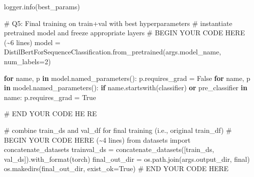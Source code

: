 \documentclass[
  letterpaper,
  DIV=11,
  numbers=noendperiod]{scrartcl}
\newenvironment{Shaded}{\begin{snugshade}}{\end{snugshade}}
\newcommand{\CommentTok}[1]{\textcolor[rgb]{0.37,0.37,0.37}{#1}}
\newcommand{\ControlFlowTok}[1]{\textcolor[rgb]{0.00,0.23,0.31}{\textbf{#1}}}
\newcommand{\DecValTok}[1]{\textcolor[rgb]{0.68,0.00,0.00}{#1}}
\newcommand{\ImportTok}[1]{\textcolor[rgb]{0.00,0.46,0.62}{#1}}
\newcommand{\KeywordTok}[1]{\textcolor[rgb]{0.00,0.23,0.31}{\textbf{#1}}}
\newcommand{\NormalTok}[1]{\textcolor[rgb]{0.00,0.23,0.31}{#1}}
\newcommand{\OperatorTok}[1]{\textcolor[rgb]{0.37,0.37,0.37}{#1}}
\newcommand{\RegionMarkerTok}[1]{\textcolor[rgb]{0.00,0.23,0.31}{#1}}
\newcommand{\StringTok}[1]{\textcolor[rgb]{0.13,0.47,0.30}{#1}}
\newcommand{\VariableTok}[1]{\textcolor[rgb]{0.07,0.07,0.07}{#1}}
\begin{document}
\begin{Shaded}
\begin{Highlighting}[]
\NormalTok{    logger.info(best\_params)}

        \CommentTok{\# Q5: Final training on train+val with best hyperparameters}
    \CommentTok{\# instantiate pretrained model and freeze appropriate layers}
    \CommentTok{\# }\RegionMarkerTok{BEGIN}\CommentTok{ YOUR CODE HERE (\textasciitilde{}6 lines)}
\NormalTok{    model }\OperatorTok{=}\NormalTok{ DistilBertForSequenceClassification.from\_pretrained(args.model\_name, num\_labels}\OperatorTok{=}\DecValTok{2}\NormalTok{)}

    \ControlFlowTok{for}\NormalTok{ name, p }\KeywordTok{in}\NormalTok{ model.named\_parameters():}
\NormalTok{        p.requires\_grad }\OperatorTok{=} \VariableTok{False}
    \ControlFlowTok{for}\NormalTok{ name, p }\KeywordTok{in}\NormalTok{ model.named\_parameters():}
        \ControlFlowTok{if}\NormalTok{ name.startswith(}\StringTok{\textquotesingle{}classifier\textquotesingle{}}\NormalTok{) }\KeywordTok{or} \StringTok{\textquotesingle{}pre\_classifier\textquotesingle{}} \KeywordTok{in}\NormalTok{ name:}
\NormalTok{            p.requires\_grad }\OperatorTok{=} \VariableTok{True}

    \CommentTok{\# }\RegionMarkerTok{END}\CommentTok{ YOUR CODE HE RE}

    \CommentTok{\# combine train\_ds and val\_df for final training (i.e., original train\_df)}
    \CommentTok{\# }\RegionMarkerTok{BEGIN}\CommentTok{ YOUR CODE HERE (\textasciitilde{}4 lines)}
    \ImportTok{from}\NormalTok{ datasets }\ImportTok{import}\NormalTok{ concatenate\_datasets}
\NormalTok{    trainval\_ds }\OperatorTok{=}\NormalTok{ concatenate\_datasets([train\_ds, val\_ds]).with\_format(}\StringTok{\textquotesingle{}torch\textquotesingle{}}\NormalTok{)}
\NormalTok{    final\_out\_dir }\OperatorTok{=}\NormalTok{ os.path.join(args.output\_dir, }\StringTok{\textquotesingle{}final\textquotesingle{}}\NormalTok{)}
\NormalTok{    os.makedirs(final\_out\_dir, exist\_ok}\OperatorTok{=}\VariableTok{True}\NormalTok{)}
    \CommentTok{\# }\RegionMarkerTok{END}\CommentTok{ YOUR CODE HERE}


\end{Highlighting}
\end{Shaded}
\end{document}
